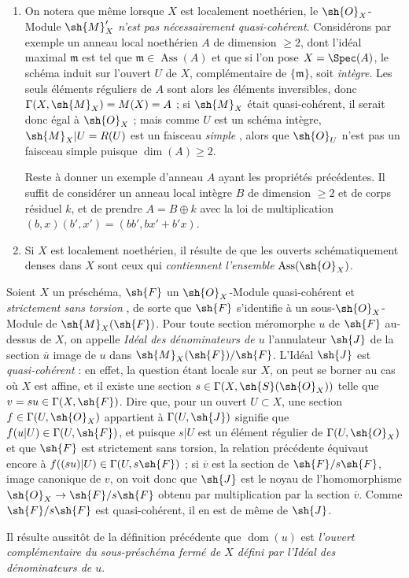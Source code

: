 \begin{remarks}[20.2.13]
\begin{enumerate}[label=(\roman*)]
  \item On notera que même lorsque $X$ est localement noethérien, le $\sh{O}_X$-Module $\sh{M}'_X$ \emph{n'est pas nécessairement quasi-cohérent}.
  Considérons par exemple un anneau local noethérien $A$ de dimension $\geq2$, dont l'idéal maximal $\mathfrak{m}$ est tel que $\mathfrak{m}\in\operatorname{Ass}(A)$ et que si l'on pose $X=\Spec(A)$, le schéma induit sur l'ouvert $U$ de $X$, complémentaire de $\{\mathfrak{m}\}$, soit \emph{intègre}.
  Les seuls éléments réguliers de $A$ sont alors les éléments inversibles, donc $\Gamma(X,\sh{M}_X)=M(X)=A$ ; si $\sh{M}_X$ était quasi-cohérent, il serait donc égal à $\sh{O}_X$ ; mais comme $U$ est un schéma intègre, $\sh{M}_X|U=R(U)$ est un faisceau \emph{simple} , alors que $\sh{O}_U$ n'est pas un faisceau simple puisque $\dim(A)\geq2$.

  Reste à donner un exemple d'anneau $A$ ayant les propriétés précédentes.
  Il suffit de considérer un anneau local intègre $B$ de dimension $\geq2$ et de corps résiduel $k$, et de prendre $A=B\oplus k$ avec la loi de multiplication $(b,x)(b',x')=(bb',bx'+b'x)$.

  \item Si $X$ est localement noethérien, il résulte de  que les ouverts schématiquement denses dans $X$ sont ceux qui \emph{contiennent l'ensemble} $\operatorname{Ass}(\sh{O}_X)$.
\end{enumerate}
\end{remarks}

\begin{env}[20.2.14]
Soient $X$ un préschéma, $\sh{F}$ un $\sh{O}_X$-Module quasi-cohérent et \emph{strictement sans torsion} , de sorte que $\sh{F}$ s'identifie à un sous-$\sh{O}_X$-Module de $\sh{M}_X(\sh{F})$.
Pour toute section méromorphe $u$ de $\sh{F}$ au-dessus de $X$, on appelle \emph{Idéal des dénominateurs de $u$} l'annulateur $\sh{J}$ de la section $\overline{u}$ image de $u$ dans $\sh{M}_X(\sh{F})/\sh{F}$.
L'Idéal $\sh{J}$ est \emph{quasi-cohérent} : en effet, la question étant locale sur $X$, on peut se borner au cas où $X$ est affine, et il existe une section $s\in\Gamma(X,\sh{S}(\sh{O}_X))$ telle que $v=su\in\Gamma(X,\sh{F})$.
Dire que, pour un ouvert $U\subset X$, une section $f\in\Gamma(U,\sh{O}_X)$ appartient à $\Gamma(U,\sh{J})$ signifie que $f(u|U)\in\Gamma(U,\sh{F})$, et puisque $s|U$ est un élément régulier de $\Gamma(U,\sh{O}_X)$ et que $\sh{F}$ est strictement sans torsion, la relation précédente équivaut encore à $f((su)|U)\in\Gamma(U,s\sh{F})$ ; si $\overline{v}$ est la section de $\sh{F}/s\sh{F}$, image canonique de $v$, on voit donc que $\sh{J}$ est le noyau de l'homomorphisme $\sh{O}_X\to\sh{F}/s\sh{F}$ obtenu par multiplication par la section $\overline{v}$.
Comme $\sh{F}/s\sh{F}$ est quasi-cohérent, il en est de même de $\sh{J}$.

Il résulte aussitôt de la définition précédente que $\operatorname{dom}(u)$ est \emph{l'ouvert complémentaire du sous-préschéma fermé de $X$ défini par l'Idéal des dénominateurs de $u$}.
\end{env}

